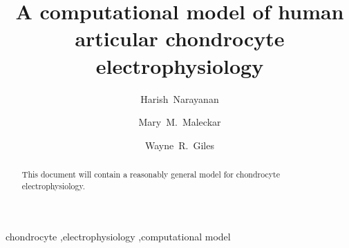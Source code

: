\begin{frontmatter}

\title{A computational model of human articular chondrocyte
  electrophysiology}

\author[srl]{Harish~Narayanan}
\author[srl]{Mary~M.~Maleckar}
\author[ucal]{Wayne~R.~Giles}

\address[srl]{Center for Biomedical Computing, Simula Research
  Laboratory, P.O.~Box~134, 1325~Lysaker, Norway}

\address[ucal]{Faculty of Kinesiology, University of Calgary, Calgary,
  Alberta, Canada T2N 4N1}

\begin{abstract}
  This document will contain a reasonably general model for
  chondrocyte electrophysiology.
\end{abstract}

\begin{keyword}
chondrocyte \sep electrophysiology \sep computational model
\end{keyword}

\end{frontmatter}

